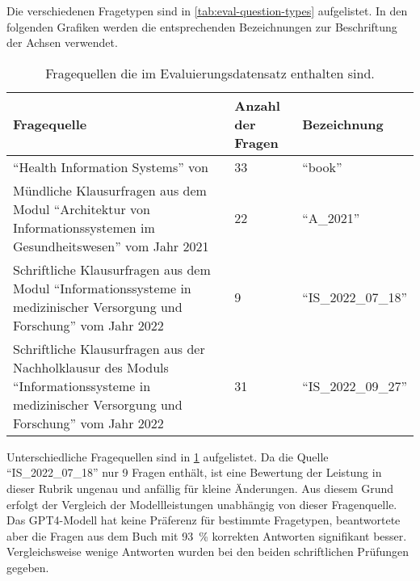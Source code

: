 Die verschiedenen Fragetypen sind in \cref{tab:eval-question-types} aufgelistet.
In den folgenden Grafiken werden die entsprechenden Bezeichnungen zur Beschriftung der Achsen verwendet.
\begin{table}
    \centering
    \begin{tabularx}{\textwidth}{Xll}
        \toprule
        \textbf{Fragequelle}                                                                                                                               & \textbf{Anzahl der Fragen} & \textbf{Bezeichnung}       \\
        \midrule
        \enquote{Health Information Systems} von \citet{bb}                                                                                                & 33                         & \enquote{book}             \\
        \midrule
        Mündliche Klausurfragen aus dem Modul \enquote{Architektur von Informationssystemen im Gesundheitswesen} vom Jahr 2021                             & 22                         & \enquote{A\_2021}          \\
        \midrule
        Schriftliche Klausurfragen aus dem Modul \enquote{Informationssysteme in medizinischer Versorgung und Forschung} vom Jahr 2022                     & 9                          & \enquote{IS\_2022\_07\_18} \\
        \midrule
        Schriftliche Klausurfragen aus der Nachholklausur des Moduls \enquote{Informationssysteme in medizinischer Versorgung und Forschung} vom Jahr 2022 & 31                         & \enquote{IS\_2022\_09\_27} \\
        \bottomrule
    \end{tabularx}
    \caption{Fragequellen die im Evaluierungsdatensatz enthalten sind.}\label{tab:eval-question-sources}
\end{table}


Unterschiedliche Fragequellen sind in \cref{tab:eval-question-sources} aufgelistet.
Da die Quelle \enquote{IS\_2022\_07\_18} nur 9 Fragen enthält, ist eine Bewertung der Leistung in dieser Rubrik ungenau und anfällig für kleine Änderungen.
Aus diesem Grund erfolgt der Vergleich der Modellleistungen unabhängig von dieser Fragenquelle.\\


Das GPT4-Modell hat keine Präferenz für bestimmte Fragetypen, beantwortete aber die Fragen aus dem Buch mit \SI{93}{\percent} korrekten Antworten signifikant besser.
Vergleichsweise wenige Antworten wurden bei den beiden schriftlichen Prüfungen gegeben.\\


